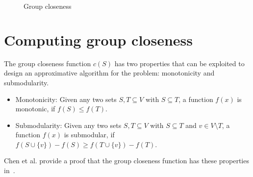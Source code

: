 \begin{figure}[h!]
\centering
{}
\caption{Group closeness}{}
\label{fig:groupCloseness}
\end{figure}

\section{Computing group closeness}
The group closeness function $c(S)$ has two properties that can be exploited to design an approximative algorithm for the problem: monotonicity and submodularity.

\begin{itemize}
	\item Monotonicity: Given any two sets $S, T \subseteq V$ with $S \subseteq T$, a function $f(x)$ is monotonic, if $f(S) \leq f(T)$.
	\item Submodularity: Given any two sets $S, T \subseteq V$ with $S \subseteq T$ and $v \in V \setminus T$, a function $f(x)$ is submodular, if $f(S \cup \{v\}) - f(S) \geq f(T \cup \{v\}) - f(T)$.
\end{itemize}
Chen et al. provide a proof that the group closeness function has these properties in~\cite{Chen2016}.

